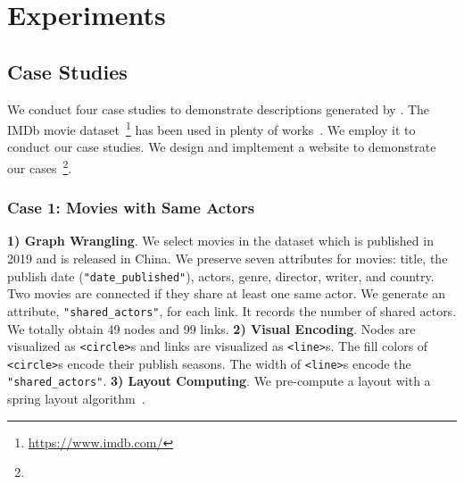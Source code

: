 \section{Experiments}
\subsection{Case Studies}
We conduct four case studies to demonstrate descriptions generated by \ApproachName.
The IMDb movie dataset~\footnote{\url{https://www.imdb.com/}} has been used in plenty of works~\cite{DBLP:journals/tvcg/SrinivasanPEB18, DBLP:journals/pvldb/KrishnanWWFG16, DBLP:conf/ieeevast/BigelowNML19}.
We employ it to conduct our case studies.
We design and impltement a website to demonstrate our cases~\footnote{}.

\subsubsection{Case 1: Movies with Same Actors}\label{sec:imdb_movies}

\textbf{1) Graph Wrangling}. We select movies in the dataset which is published in 2019 and is released in China.
We preserve seven attributes for movies: title, the publish date (\texttt{"date\_published"}), actors, genre, director, writer, and country.
Two movies are connected if they share at least one same actor.
We generate an attribute, \texttt{"shared\_actors"}, for each link. 
It records the number of shared actors.
We totally obtain 49 nodes and 99 links.
\textbf{2) Visual Encoding}. Nodes are visualized as \texttt{<circle>}s and links are visualized as \texttt{<line>}s.
The fill colors of \texttt{<circle>}s encode their publish seasons.
The width of \texttt{<line>}s encode the \texttt{"shared\_actors"}.
\textbf{3) Layout Computing}. We pre-compute a layout with a spring layout algorithm~\cite{DBLP:journals/spe/FruchtermanR91}.

